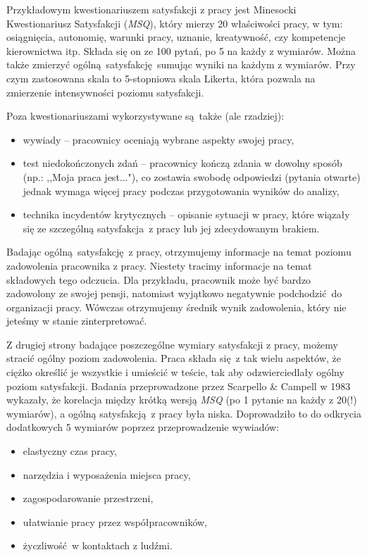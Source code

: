 Przykładowym kwestionariuszem satysfakcji z pracy jest Minesocki Kwestionariusz Satysfakcji (\emph{MSQ}), który mierzy 20 właściwości pracy, w tym: osiągnięcia, autonomię, warunki pracy, uznanie, kreatywność, czy kompetencje kierownictwa itp. Składa się on ze 100 pytań, po 5 na każdy z wymiarów. Można także zmierzyć
ogólną satysfakcję sumując wyniki na każdym z wymiarów. Przy czym zastosowana skala to 5-stopniowa skala Likerta, która pozwala na zmierzenie intensywności poziomu satysfakcji.

Poza kwestionariuszami wykorzystywane są także (ale rzadziej):
\begin{itemize}
\item wywiady -- pracownicy oceniają wybrane aspekty swojej pracy,
\item test niedokończonych zdań -- pracownicy kończą zdania w dowolny sposób (np.: ,,Moja praca jest..."), co zostawia swobodę odpowiedzi (pytania otwarte) jednak wymaga więcej pracy podczas przygotowania wyników do analizy,
\item technika incydentów krytycznych -- opisanie sytuacji w pracy, które wiązały się ze szczególną satysfakcja z pracy lub jej zdecydowanym brakiem.
\end{itemize}

Badając ogólną satysfakcję z pracy, otrzymujemy informacje na temat poziomu zadowolenia pracownika z pracy. Niestety tracimy informacje na temat składowych tego odczucia. Dla przykładu, pracownik może być bardzo zadowolony ze swojej pensji, natomiast wyjątkowo negatywnie podchodzić do organizacji pracy. Wówczas otrzymujemy średnik wynik zadowolenia, który nie jeteśmy w stanie zinterpretować.

Z drugiej strony badające poszczególne wymiary satysfakcji z pracy, możemy stracić ogólny poziom zadowolenia. Praca składa się z tak wielu aspektów, że ciężko określić je wszystkie i umieścić w teście, tak aby odzwierciedlały ogólny poziom satysfakcji. Badania przeprowadzone przez Scarpello \& Campell w 1983 wykazały, że korelacja między krótką wersją \emph{MSQ} (po 1 pytanie na każdy z 20(!) wymiarów), a ogólną satysfakcją z pracy była niska. Doprowadziło to do odkrycia dodatkowych
5 wymiarów poprzez przeprowadzenie wywiadów:
\begin{itemize}
\item elastyczny czas pracy,
\item narzędzia i wyposażenia miejsca pracy,
\item zagospodarowanie przestrzeni,
\item ułatwianie pracy przez współpracowników,
\item życzliwość w kontaktach z ludźmi.
\end{itemize}
